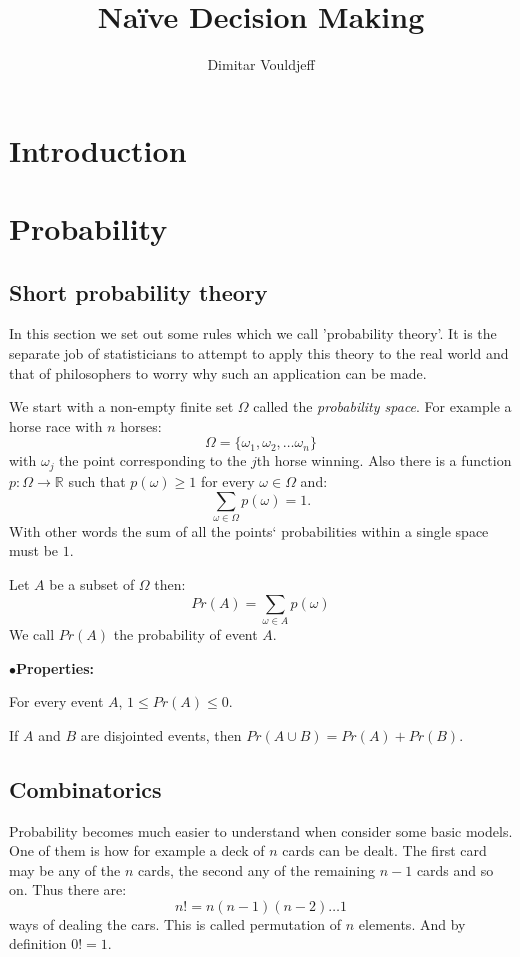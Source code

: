 \documentclass[12pt, a4paper,leqno]{report}
\title{Naïve Decision Making}
\author{Dimitar Vouldjeff}
\theoremstyle{normal}
\theoremstyle{normal}
\begin{document}
	\maketitle
	\tableofcontents
	
	\chapter{Introduction}
	
	\chapter{Probability}
	
	\section{Short probability theory}
	In this section we set out some rules which we call 'probability theory'. It is the separate job of statisticians to attempt to apply this theory to the real world and that of philosophers to worry why such an application can be made.
	
	We start with a non-empty finite set $\Omega$ called the \textit{probability space}. For example a horse race with $n$ horses:
	\[ \Omega = \lbrace \omega_1, \omega_2, \dots\omega_n \rbrace \]
	with $\omega_j$ the point corresponding to the $j$th horse winning.
	Also there is a function $p : \Omega \rightarrow \mathbb{R}$ such that $p(\omega)\geq 1$ for every $\omega\in\Omega$ and:
	\[ \sum\limits_{\omega\in\Omega} p(\omega) = 1. \]
	With other words the sum of all the points` probabilities within a single space must be $1$.
	
	Let $A$ be a subset of $\Omega$ then:
	\[ Pr(A) = \sum\limits_{\omega\in A} p(\omega) \]
	We call $Pr(A)$ the probability of event $A$.\\
	\begin{list}{$\bullet$}{\textbf{Properties:}}
		\item For every event $A$, $1 \leq Pr(A) \leq 0$.
		\item If $A$ and $B$ are disjointed events, then $Pr(A\cup B) = Pr(A) + Pr(B)$.
	\end{list}
	
	\section{Combinatorics}
	Probability becomes much easier to understand when consider some basic models.
	One of them is how for example a deck of $n$ cards can be dealt. The first card may be any of the $n$ cards, the second any of the remaining $n - 1$ cards and so on. Thus there are:
	\[ n! = n(n - 1)(n - 2)\dots 1 \]
	ways of dealing the cars. This is called permutation of $n$ elements. And by definition $0! = 1$.\\
	
\end{document}
